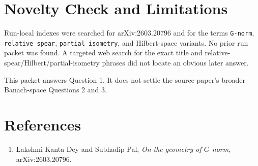 \documentclass[11pt]{article}
\begin{document}
\section*{Novelty Check and Limitations}

Run-local indexes were searched for arXiv:2603.20796 and for the terms
\texttt{G-norm}, \texttt{relative spear}, \texttt{partial isometry}, and
Hilbert-space variants.  No prior run packet was found.  A targeted web search
for the exact title and relative-spear/Hilbert/partial-isometry phrases did not
locate an obvious later answer.

This packet answers Question 1.  It does not settle the source paper's broader
Banach-space Questions 2 and 3.

\section*{References}

\begin{enumerate}
\item Lakshmi Kanta Dey and Subhadip Pal, \emph{On the geometry of
$G$-norm}, arXiv:2603.20796.
\end{enumerate}
\end{document}
